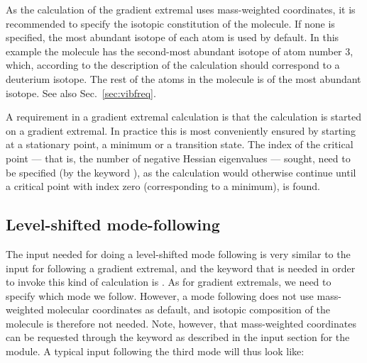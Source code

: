 As the calculation of the gradient extremal uses mass-weighted
coordinates, it is recommended to
specify the isotopic constitution of
the molecule. If none is specified, the most abundant
isotope of each atom is used by default. In this example the
molecule has the second-most abundant isotope of atom number 3, which,
according to the description of the calculation should correspond
to a deuterium isotope. The rest of the atoms in the molecule is of
the most abundant isotope. See also Sec.~\ref{sec:vibfreq}.

A requirement in a gradient extremal calculation is that the
calculation is started on a gradient extremal. In practice this is
most conveniently ensured by starting at a stationary point, a minimum
or a transition state. The index of the critical point
--- that is,
the number of negative Hessian eigenvalues
--- sought, need to
be specified (by the keyword ), as the calculation would
otherwise continue until a critical point with index zero
(corresponding to a minimum), is found.

\subsection{Level-shifted mode-following}\label{sec:modfol}

\begin{center}
\end{center}

The input needed for doing a level-shifted mode following is very
similar to the input for following a gradient extremal, and the
keyword that is needed in order to invoke this kind of calculation is
. As for gradient extremals, we need to specify which
mode we follow. However, a mode following does not use mass-weighted
molecular coordinates as default, and
isotopic composition of the
molecule is therefore not needed. Note, however, that mass-weighted
coordinates can be requested through the keyword  as
described in the input section for the  module. A typical
input following the third mode will thus look like:

